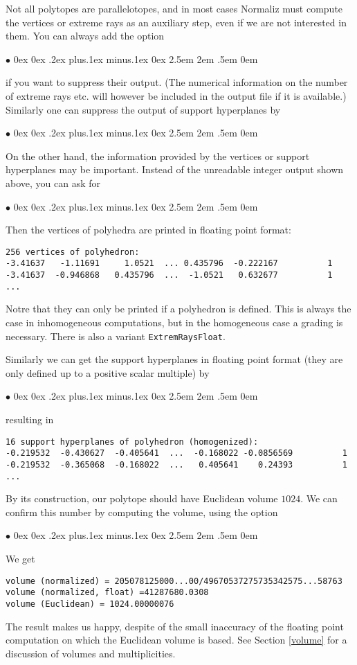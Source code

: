 \documentclass[12pt,a4paper]{scrartcl}
\newcommand{\stdli}{ \topsep0ex \partopsep0ex %
\parsep.2ex plus.1ex minus.1ex \itemsep0ex%
\leftmargin2.5em \labelwidth2em \labelsep.5em \rightmargin0em}%
\renewenvironment{itemize}{\begin{list}{{$\bullet$}}{\stdli}}{\end{list}}
\theoremstyle{definition}
\def\itemtt[#1]{\item[\textbf{\ttt{#1}}]}
\def\ttt{\texttt}
\begin{document}
Not all polytopes are parallelotopes, and in most cases Normaliz must compute the vertices or extreme rays as an auxiliary step, even if we are not interested in them. You can always add the option
\begin{itemize}
	\itemtt [NoExtRaysOutput]
\end{itemize}
if you want to suppress their output. (The numerical information on the number of extreme rays etc. will however be included in the output file if it is available.) Similarly one can suppress the output of support hyperplanes by
\begin{itemize}
	\itemtt [NoSuppHypsOutput]
\end{itemize}

On the other hand, the information provided by the vertices or support hyperplanes may be important. Instead of the unreadable integer output shown above, you can ask for
\begin{itemize}
	\itemtt [VerticesFloat]
\end{itemize}
Then the vertices of polyhedra are printed in floating point format:
\begin{Verbatim}
256 vertices of polyhedron:
-3.41637   -1.11691     1.0521  ... 0.435796  -0.222167          1 
-3.41637  -0.946868   0.435796  ...  -1.0521   0.632677          1
...
\end{Verbatim}
Notre that they can only be printed if a polyhedron is defined. This is always the case in inhomogeneous computations, but in the homogeneous case a grading is necessary. There is also a variant \verb|ExtremRaysFloat|.

Similarly we can get the support hyperplanes in floating point format (they are only defined up to a positive scalar multiple) by
\begin{itemize}
	\itemtt [SuppHypsFloat]
\end{itemize}
resulting in
\begin{Verbatim}
16 support hyperplanes of polyhedron (homogenized):
-0.219532  -0.430627  -0.405641  ...  -0.168022 -0.0856569          1 
-0.219532  -0.365068  -0.168022  ...   0.405641    0.24393          1 
...  
\end{Verbatim}

By its construction, our polytope should have Euclidean volume $1024$. We can confirm this number by computing the volume, using the option
\begin{itemize}
	\itemtt [Volume, -V]
\end{itemize}
We get
\begin{Verbatim}
volume (normalized) = 205078125000...00/49670537275735342575...58763
volume (normalized, float) =41287680.0308
volume (Euclidean) = 1024.00000076
\end{Verbatim}
The result makes us happy, despite of the small inaccuracy of the floating point computation on which the Euclidean volume is based. See Section \ref{volume} for a discussion of volumes and multiplicities.
\end{document}

